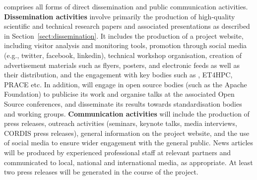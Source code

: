 \begin{Workpackage}{\thewpno}
\begin{Task}
\TaskHeader{}


\theTask{} comprises all forms of direct dissemination and public communication activities.
%
\textbf{Dissemination activities} involve primarily the production of high-quality scientific and technical research papers and associated presentations as described in Section~\ref{sect:dissemination}.
It includes the production of a project website, including visitor analysis and monitoring tools, promotion through social media (e.g., twitter, facebook, linkedin), technical workshop organisation, creation of advertisement materials such as flyers, posters, and electronic feeds as well as their distribution, and the engagement with key bodies such as \hipeac, ET4HPC, PRACE etc. In addition, \TheProject  will engage in open source bodies (such as the Apache Foundation) to publicise its work and organise talks at the associated Open Source conferences,
and disseminate its results towards standardisation bodies and working groups.
%
\textbf{Communication activities} will include the production of press releases, outreach activities (seminars, keynote talks, media interviews, CORDIS press releases), general information on the project website, and the use of social media to ensure wider engagement with the general public.
News articles will be produced by experienced professional staff at relevant partners and communicated to local, national and international media, as appropriate.
At least two press releases will be generated in the course of the project.

\end{Task}

\begin{Task}

\TaskHeader{}



\end{Task}
\end{Workpackage}
